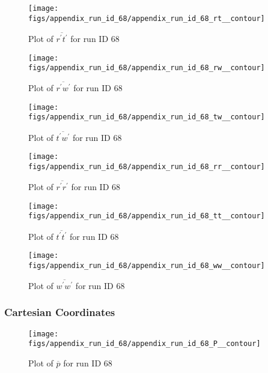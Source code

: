 \begin{figure}[H]
\centering
\texttt{[image: figs/appendix\_run\_id\_68/appendix\_run\_id\_68\_rt\_\_contour]}
\caption{Plot of $\overline{r^\prime t^\prime}$ for run ID 68}
\label{fig:appendix_run_id_68_rt__contour}
\end{figure}


\begin{figure}[H]
\centering
\texttt{[image: figs/appendix\_run\_id\_68/appendix\_run\_id\_68\_rw\_\_contour]}
\caption{Plot of $\overline{r^\prime w^\prime}$ for run ID 68}
\label{fig:appendix_run_id_68_rw__contour}
\end{figure}


\begin{figure}[H]
\centering
\texttt{[image: figs/appendix\_run\_id\_68/appendix\_run\_id\_68\_tw\_\_contour]}
\caption{Plot of $\overline{t^\prime w^\prime}$ for run ID 68}
\label{fig:appendix_run_id_68_tw__contour}
\end{figure}


\begin{figure}[H]
\centering
\texttt{[image: figs/appendix\_run\_id\_68/appendix\_run\_id\_68\_rr\_\_contour]}
\caption{Plot of $\overline{r^\prime r^\prime}$ for run ID 68}
\label{fig:appendix_run_id_68_rr__contour}
\end{figure}


\begin{figure}[H]
\centering
\texttt{[image: figs/appendix\_run\_id\_68/appendix\_run\_id\_68\_tt\_\_contour]}
\caption{Plot of $\overline{t^\prime t^\prime}$ for run ID 68}
\label{fig:appendix_run_id_68_tt__contour}
\end{figure}


\begin{figure}[H]
\centering
\texttt{[image: figs/appendix\_run\_id\_68/appendix\_run\_id\_68\_ww\_\_contour]}
\caption{Plot of $\overline{w^\prime w^\prime}$ for run ID 68}
\label{fig:appendix_run_id_68_ww__contour}
\end{figure}


\subsubsection{Cartesian Coordinates}
\begin{figure}[H]
\centering
\texttt{[image: figs/appendix\_run\_id\_68/appendix\_run\_id\_68\_P\_\_contour]}
\caption{Plot of $\overline{p}$ for run ID 68}
\label{fig:appendix_run_id_68_P__contour}
\end{figure}


